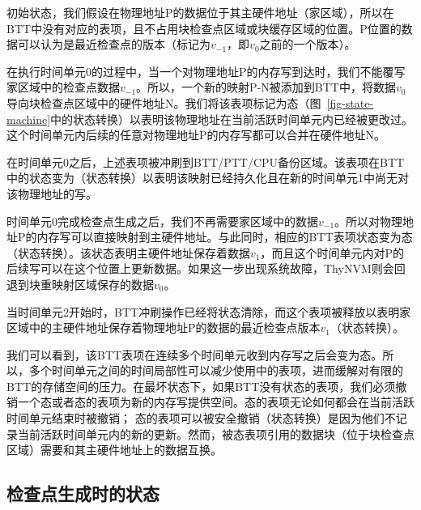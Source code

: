 \vspace{\noindentsep}
\noindent{} 初始状态，我们假设在物理地址P的数据位于其主硬件地址（家区域），所以在BTT中没有对应的表项，且不占用块检查点区域或块缓存区域的位置。P位置的数据可以认为是最近检查点的版本（标记为$v_{-1}$，即$v_0$之前的一个版本）。

\vspace{\noindentsep}
\noindent{} 在执行时间单元0的过程中，当一个对物理地址P的内存写到达时，我们不能覆写家区域中的检查点数据$v_{-1}$。所以，一个新的映射P-N被添加到BTT中，将数据$v_0$导向块检查点区域中的硬件地址N。我们将该表项标记为态（图~\ref{fig-state-machine}中的状态转换）以表明该物理地址在当前活跃时间单元内已经被更改过。这个时间单元内后续的任意对物理地址P的内存写都可以合并在硬件地址N。

\vspace{\noindentsep}
\noindent{} 在时间单元0之后，上述表项被冲刷到BTT/PTT/CPU备份区域。该表项在BTT中的状态变为（状态转换）以表明该映射已经持久化且在新的时间单元1中尚无对该物理地址的写。

\vspace{\noindentsep}
\noindent{} 时间单元0完成检查点生成之后，我们不再需要家区域中的数据$v_{-1}$。所以对物理地址P的内存写可以直接映射到主硬件地址。与此同时，相应的BTT表项状态变为态（状态转换）。该状态表明主硬件地址保存着数据$v_1$，而且这个时间单元内对P的后续写可以在这个位置上更新数据。如果这一步出现系统故障，ThyNVM则会回退到块重映射区域保存的数据$v_{0}$。

\vspace{\noindentsep}
\noindent{} 当时间单元2开始时，BTT冲刷操作已经将状态清除，而这个表项被释放以表明家区域中的主硬件地址保存着物理地址P的数据的最近检查点版本$v_1$（状态转换）。

我们可以看到，该BTT表项在连续多个时间单元收到内存写之后会变为态。所以，多个时间单元之间的时间局部性可以减少使用中的表项，进而缓解对有限的BTT的存储空间的压力。在最坏状态下，如果BTT没有状态的表项，我们必须撤销一个态或者态的表项为新的内存写提供空间。态的表项无论如何都会在当前活跃时间单元结束时被撤销；
态的表项可以被安全撤销（状态转换）是因为他们不记录当前活跃时间单元内的新的更新。然而，被态表项引用的数据块（位于块检查点区域）需要和其主硬件地址上的数据互换。

\subsection{检查点生成时的状态}
\label{subsec:states-ckpt}

